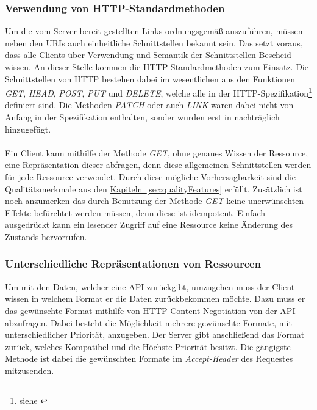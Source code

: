 \subsubsection{Verwendung von HTTP-Standardmethoden}
Um die vom Server bereit gestellten Links ordnungsgemäß auszuführen, müssen neben den \glspl{URI} auch einheitliche Schnittstellen bekannt sein. Das setzt voraus, dass alle Clients über Verwendung und Semantik der Schnittstellen Bescheid wissen. An dieser Stelle kommen die \gls{HTTP}-Standardmethoden zum Einsatz. Die Schnittstellen von \gls{HTTP} bestehen dabei im wesentlichen aus den Funktionen \textit{GET}, \textit{HEAD}, \textit{POST}, \textit{PUT} und \textit{DELETE}, welche alle in der \gls{HTTP}-Spezifikation\footnote{siehe \cite{httpSpecification}} definiert sind. Die Methoden \textit{PATCH} oder auch \textit{LINK} waren dabei nicht von Anfang in der Spezifikation enthalten, sonder wurden erst in nachträglich hinzugefügt.\\
\\
Ein Client kann mithilfe der Methode \textit{GET}, ohne genaues Wissen der Ressource, eine Repräsentation dieser abfragen, denn diese allgemeinen Schnittstellen werden für jede Ressource verwendet. Durch diese mögliche Vorhersagbarkeit sind die Qualitätsmerkmale aus den \hyperref[sec:qualityFeatures]{Kapiteln~\ref{sec:qualityFeatures}} erfüllt. Zusätzlich ist noch anzumerken das durch Benutzung der Methode \textit{GET} keine unerwünschten Effekte befürchtet werden müssen, denn diese ist idempotent. Einfach ausgedrückt kann ein lesender Zugriff auf eine Ressource keine Änderung des Zustands hervorrufen.

\subsubsection{Unterschiedliche Repräsentationen von Ressourcen}
Um mit den Daten, welcher eine \gls{API} zurückgibt, umzugehen muss der Client wissen in welchem Format er die Daten zurückbekommen möchte. Dazu muss er das gewünschte Format mithilfe von \gls{HTTP} Content Negotiation von der \gls{API} abzufragen. Dabei besteht die Möglichkeit mehrere gewünschte Formate, mit unterschiedlicher Priorität, anzugeben. Der Server gibt anschließend das Format zurück, welches Kompatibel und die Höchste Priorität besitzt. Die gängigste Methode ist dabei die gewünschten Formate im \textit{Accept-Header} des Requestes mitzusenden.

